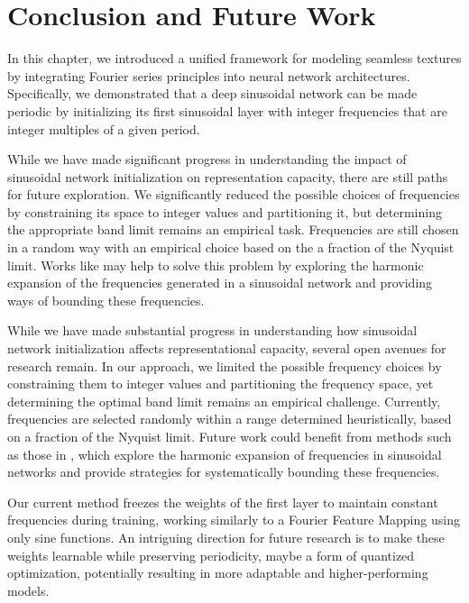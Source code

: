 


\section{Conclusion and Future Work}

In this chapter, we introduced a unified framework for modeling seamless textures by integrating Fourier series principles into neural network architectures. Specifically, we demonstrated that a deep sinusoidal network can be made periodic by initializing its first sinusoidal layer with integer frequencies that are integer multiples of a given period.

While we have made significant progress in understanding the impact of sinusoidal network initialization on representation capacity, there are still paths for future exploration. We significantly reduced the possible choices of frequencies by constraining its space to integer values and partitioning it, but determining the appropriate band limit remains an empirical task. Frequencies are still chosen in a random way with an empirical choice based on the a fraction of the Nyquist limit. Works like \cite{tamingFactory} may help to solve this problem by exploring the harmonic expansion of the frequencies generated in a sinusoidal network and providing ways of bounding these frequencies.

While we have made substantial progress in understanding how sinusoidal network initialization affects representational capacity, several open avenues for research remain. In our approach, we limited the possible frequency choices by constraining them to integer values and partitioning the frequency space, yet determining the optimal band limit remains an empirical challenge. Currently, frequencies are selected randomly within a range determined heuristically, based on a fraction of the Nyquist limit. Future work could benefit from methods such as those in \cite{tamingFactory}, which explore the harmonic expansion of frequencies in sinusoidal networks and provide strategies for systematically bounding these frequencies.

Our current method freezes the weights of the first layer to maintain constant frequencies during training, working similarly to a Fourier Feature Mapping using only sine functions. An intriguing direction for future research is to make these weights learnable while preserving periodicity, maybe a form of quantized optimization, potentially resulting in more adaptable and higher-performing models.

